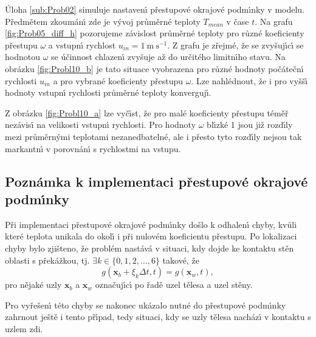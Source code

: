             \'{U}loha \ref{sub:Prob02} simuluje nastaven\'{\i} p\v{r}estupov\'{e} okrajov\'{e} podm\'{\i}nky v modelu. P\v{r}edm\v{e}tem zkoum\'{a}n\'{\i} zde je v\'{y}voj pr\r{u}m\v{e}rn\'{e} teploty $T_{mean}$ v \v{c}ase $t$. Na grafu \ref{fig:Prob05_diff_h} pozorujeme z\'{a}vislost pr\r{u}m\v{e}rn\'{e} teploty pro r\r{u}zn\'{e} koeficienty p\v{r}estupu $\omega$ a vstupn\'{\i} rychlost $u_{in} = 1 \ \mathrm{m \ s^{-1}}$. Z grafu je z\v{r}ejm\'{e}, \v{z}e se zvy\v{s}uj\'{\i}c\'{\i} se hodnotou $\omega$ se \'{u}\v{c}innost chlazen\'{\i} zvy\v{s}uje a\v{z} do ur\v{c}it\'{e}ho limitn\'{\i}ho stavu. Na obr\'{a}zku \ref{fig:Probl10_b} je tato situace vyobrazena pro r\r{u}zn\'{e} hodnoty po\v{c}\'{a}te\v{c}n\'{\i} rychlosti $u_{in}$ a pro vybran\'{e} koeficienty p\v{r}estupu $\omega$. Lze nahl\'{e}dnout, \v{z}e i pro vy\v{s}\v{s}\'{\i} hodnoty vstupn\'{\i} rychlosti pr\r{u}m\v{e}rn\'{e} teploty konverguj\'{\i}.
        
            Z obr\'{a}zku \ref{fig:Probl10_a} lze vy\v{c}\'{\i}st, \v{z}e pro mal\'{e} koeficienty p\v{r}estupu t\'{e}m\v{e}\v{r} nez\'{a}vis\'{\i} na velikosti vstupn\'{\i} rychlosti. Pro hodnoty $\omega$ bl\'{\i}zk\'{e} 1 jsou ji\v{z} rozd\'{\i}ly mezi pr\r{u}m\v{e}rn\'{y}mi teplotami nezanedbateln\'{e}, ale i p\v{r}esto tyto rozd\'{\i}ly nejsou tak markantn\'{\i} v porovn\'{a}n\'{\i} s rychlostmi na vstupu. 
        

        \subsection{Pozn\'{a}mka k implementaci p\v{r}estupov\'{e} okrajov\'{e} podm\'{\i}nky}

            P\v{r}i implementaci p\v{r}estupov\'{e} okrajov\'{e} podm\'{\i}nky do\v{s}lo k odhalen\'{\i} chyby, kv\r{u}li kter\'{e} teplota unikala do okol\'{\i} i p\v{r}i nulov\'{e}m koeficientu p\v{r}estupu. Po lokalizaci chyby bylo zji\v{s}teno, \v{z}e probl\'{e}m nast\'{a}v\'{a} v situaci, kdy dojde ke kontaktu st\v{e}n oblasti s p\v{r}ek\'{a}\v{z}kou, tj. $\exists k \in \{0,1,2,\dots,6\}$ takov\'{e}, \v{z}e
            \begin{equation}
                g(\boldsymbol{x}_b + \xi_k \Delta t, t) = g(\boldsymbol{x}_w, t), 
            \end{equation}
            pro n\v{e}jak\'{e} uzly $\boldsymbol{x}_b$ a $\boldsymbol{x}_w$ ozna\v{c}uj\'{\i}c\'{\i} po \v{r}ad\v{e} uzel t\v{e}lesa a uzel st\v{e}ny. 
        
            Pro vy\v{r}e\v{s}en\'{\i} t\'{e}to chyby se nakonec uk\'{a}zalo nutn\'{e} do p\v{r}estupov\'{e} podm\'{\i}nky zahrnout je\v{s}t\v{e} i tento p\v{r}\'{\i}pad, tedy situaci, kdy se uzly t\v{e}lesa nach\'{a}z\'{\i} v kontaktu s uzlem zdi.


